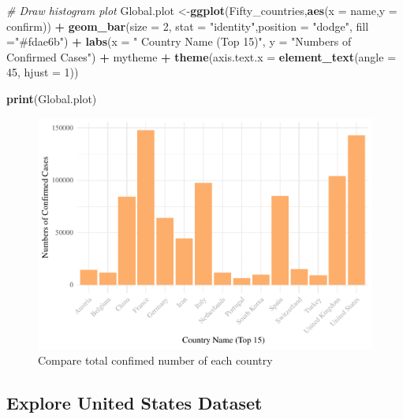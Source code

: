 \documentclass[12pt,]{article}
\newenvironment{Shaded}{\begin{snugshade}}{\end{snugshade}}
\newcommand{\CommentTok}[1]{\textcolor[rgb]{0.56,0.35,0.01}{\textit{#1}}}
\newcommand{\DataTypeTok}[1]{\textcolor[rgb]{0.13,0.29,0.53}{#1}}
\newcommand{\DecValTok}[1]{\textcolor[rgb]{0.00,0.00,0.81}{#1}}
\newcommand{\KeywordTok}[1]{\textcolor[rgb]{0.13,0.29,0.53}{\textbf{#1}}}
\newcommand{\NormalTok}[1]{#1}
\newcommand{\OperatorTok}[1]{\textcolor[rgb]{0.81,0.36,0.00}{\textbf{#1}}}
\newcommand{\StringTok}[1]{\textcolor[rgb]{0.31,0.60,0.02}{#1}}
\begin{document}
\begin{Shaded}
\begin{Highlighting}[]
\CommentTok{# Draw histogram plot}
\NormalTok{Global.plot <-}\KeywordTok{ggplot}\NormalTok{(Fifty_countries,}\KeywordTok{aes}\NormalTok{(}\DataTypeTok{x =}\NormalTok{ name,}\DataTypeTok{y =}\NormalTok{ confirm)) }\OperatorTok{+}\StringTok{ }
\StringTok{  }\KeywordTok{geom_bar}\NormalTok{(}\DataTypeTok{size =} \DecValTok{2}\NormalTok{, }\DataTypeTok{stat =} \StringTok{"identity"}\NormalTok{,}\DataTypeTok{position =} \StringTok{"dodge"}\NormalTok{, }\DataTypeTok{fill =}\StringTok{"#fdae6b"}\NormalTok{) }\OperatorTok{+}\StringTok{ }
\StringTok{  }\KeywordTok{labs}\NormalTok{(}\DataTypeTok{x =} \StringTok{" Country Name (Top 15)"}\NormalTok{,}
       \DataTypeTok{y =} \StringTok{"Numbers of Confirmed Cases"}\NormalTok{) }\OperatorTok{+}\StringTok{ }
\StringTok{  }\NormalTok{mytheme }\OperatorTok{+}
\StringTok{  }\KeywordTok{theme}\NormalTok{(}\DataTypeTok{axis.text.x =} \KeywordTok{element_text}\NormalTok{(}\DataTypeTok{angle =} \DecValTok{45}\NormalTok{, }\DataTypeTok{hjust =} \DecValTok{1}\NormalTok{))}

\KeywordTok{print}\NormalTok{(Global.plot)}
\end{Highlighting}
\end{Shaded}

\begin{figure}
\centering
\includegraphics{Feng_ENV872_Project_files/figure-latex/Global.plot-1.pdf}
\caption{Compare total confimed number of each country}
\end{figure}

\hypertarget{explore-united-states-dataset}{%
\subsection{Explore United States
Dataset}\label{explore-united-states-dataset}}
\end{document}
